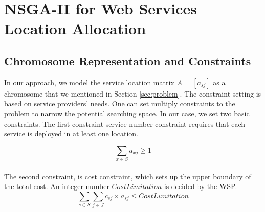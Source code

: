 \documentclass{llncs}
\begin{document}


\section{NSGA-II for Web Services Location Allocation}
\label{sec:algorithm_des}

\subsection{Chromosome Representation and Constraints}
In our approach, we model the service location matrix $A$ = $[a_{sj}]$ as a chromosome that we mentioned in Section 
\ref{sec:problem}. The constraint setting is based on service providers' needs. One can set multiply constraints to the problem to narrow the potential searching space.
In our case, we set two basic constraints. The first constraint service number constraint requires that each service is deployed in at 
least one location.

\vspace*{-1em}
{
	\centering
	\begin{equation}
		\sum\limits_{x \in S} a_{xj} \geq 1
	\end{equation}
\\}
The second constraint, is cost constraint, which sets up  the upper boundary of the total cost.
An integer number $CostLimitation$ is decided by the WSP.
{
	\centering
	\begin{equation}
		\sum\limits_{s \in S} \sum\limits_{j \in J} c_{sj} \times a_{sj} \leq CostLimitation
	\end{equation}
\\}
\vspace*{-1em}
\end{document}
